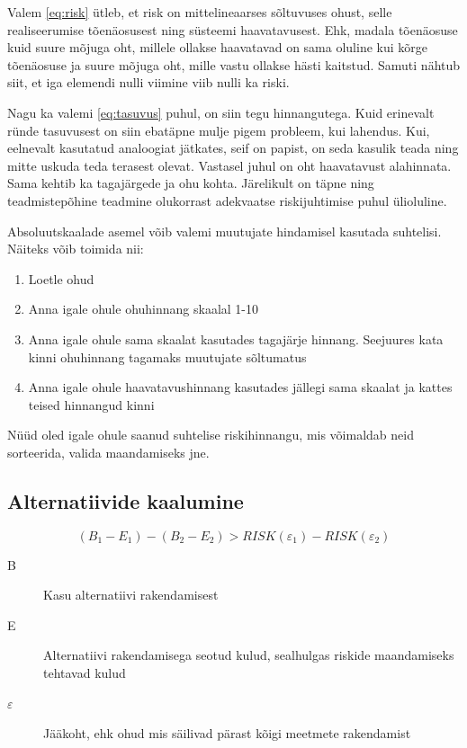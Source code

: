 Valem \ref{eq:risk} ütleb, et risk on mittelineaarses sõltuvuses ohust, selle realiseerumise tõenäosusest ning süsteemi haavatavusest. Ehk, madala tõenäosuse kuid suure mõjuga oht, millele ollakse haavatavad on sama oluline kui kõrge tõenäosuse ja suure mõjuga oht, mille vastu ollakse hästi kaitstud. Samuti nähtub siit, et iga elemendi nulli viimine viib nulli ka riski. 

Nagu ka valemi \ref{eq:tasuvus} puhul, on siin tegu hinnangutega. Kuid erinevalt ründe tasuvusest on siin ebatäpne mulje pigem probleem, kui lahendus. Kui, eelnevalt kasutatud analoogiat jätkates, seif on papist, on seda kasulik teada ning mitte uskuda teda terasest olevat. Vastasel juhul on oht haavatavust alahinnata. Sama kehtib ka tagajärgede ja ohu kohta. Järelikult on täpne ning teadmistepõhine teadmine olukorrast adekvaatse riskijuhtimise puhul ülioluline.

Absoluutskaalade asemel võib valemi muutujate hindamisel kasutada suhtelisi. Näiteks võib toimida nii:

\begin{enumerate}
	\item Loetle ohud
	\item Anna igale ohule ohuhinnang skaalal 1-10
	\item Anna igale ohule sama skaalat kasutades tagajärje hinnang. Seejuures kata kinni ohuhinnang tagamaks muutujate sõltumatus
	\item Anna igale ohule haavatavushinnang kasutades jällegi sama skaalat ja kattes teised hinnangud kinni
\end{enumerate}

Nüüd oled igale ohule saanud suhtelise riskihinnangu, mis võimaldab neid sorteerida, valida maandamiseks jne.  

\subsection{Alternatiivide kaalumine}
\begin{equation}
	(B_1 - E_1) - (B_2 - E_2) > RISK(\varepsilon_1)-RISK(\varepsilon_2)
	\label{eq:alternative}
\end{equation}

\begin{description}
	\item[B] Kasu alternatiivi rakendamisest
	\item[E] Alternatiivi rakendamisega seotud kulud, sealhulgas riskide maandamiseks tehtavad kulud 
	\item[$\varepsilon$] Jääkoht, ehk ohud mis säilivad pärast kõigi meetmete rakendamist
\end{description}

